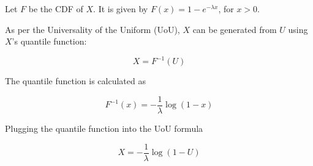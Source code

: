 Let $F$ be the CDF of $X$.
It is given by $F(x) = 1 - e^{-\lambda x}$, for $x>0$.

As per the Universality of the Uniform (UoU), $X$ can be generated from $U$ using $X$'s quantile function:

$$
X = F^{-1}(U)
$$

The quantile function is calculated as

$$
F^{-1}(x) = -\frac{1}{\lambda} \log(1-x)
$$

Plugging the quantile function into the UoU formula

$$
X = -\frac{1}{\lambda} \log(1 - U)
$$
